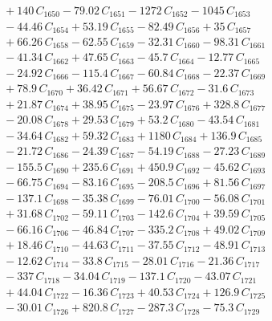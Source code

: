 \documentclass[a4paper,11pt]{article}
\begin{document}
\begin{align}
&\quad + 140\,C_{1650} - 79.02\,C_{1651} - 1272\,C_{1652} - 1045\,C_{1653} \nonumber\\
&\quad - 44.46\,C_{1654} + 53.19\,C_{1655} - 82.49\,C_{1656} + 35\,C_{1657} \nonumber\\
&\quad + 66.26\,C_{1658} - 62.55\,C_{1659} - 32.31\,C_{1660} - 98.31\,C_{1661} \nonumber\\
&\quad - 41.34\,C_{1662} + 47.65\,C_{1663} - 45.7\,C_{1664} - 12.77\,C_{1665} \nonumber\\
&\quad - 24.92\,C_{1666} - 115.4\,C_{1667} - 60.84\,C_{1668} - 22.37\,C_{1669} \nonumber\\
&\quad + 78.9\,C_{1670} + 36.42\,C_{1671} + 56.67\,C_{1672} - 31.6\,C_{1673} \nonumber\\
&\quad + 21.87\,C_{1674} + 38.95\,C_{1675} - 23.97\,C_{1676} + 328.8\,C_{1677} \nonumber\\
&\quad - 20.08\,C_{1678} + 29.53\,C_{1679} + 53.2\,C_{1680} - 43.54\,C_{1681} \nonumber\\
&\quad - 34.64\,C_{1682} + 59.32\,C_{1683} + 1180\,C_{1684} + 136.9\,C_{1685} \nonumber\\
&\quad - 21.72\,C_{1686} - 24.39\,C_{1687} - 54.19\,C_{1688} - 27.23\,C_{1689} \nonumber\\
&\quad - 155.5\,C_{1690} + 235.6\,C_{1691} + 450.9\,C_{1692} - 45.62\,C_{1693} \nonumber\\
&\quad - 66.75\,C_{1694} - 83.16\,C_{1695} - 208.5\,C_{1696} + 81.56\,C_{1697} \nonumber\\
&\quad - 137.1\,C_{1698} - 35.38\,C_{1699} - 76.01\,C_{1700} - 56.08\,C_{1701} \nonumber\\
&\quad + 31.68\,C_{1702} - 59.11\,C_{1703} - 142.6\,C_{1704} + 39.59\,C_{1705} \nonumber\\
&\quad - 66.16\,C_{1706} - 46.84\,C_{1707} - 335.2\,C_{1708} + 49.02\,C_{1709} \nonumber\\
&\quad + 18.46\,C_{1710} - 44.63\,C_{1711} - 37.55\,C_{1712} - 48.91\,C_{1713} \nonumber\\
&\quad - 12.62\,C_{1714} - 33.8\,C_{1715} - 28.01\,C_{1716} - 21.36\,C_{1717} \nonumber\\
&\quad - 337\,C_{1718} - 34.04\,C_{1719} - 137.1\,C_{1720} - 43.07\,C_{1721} \nonumber\\
&\quad + 44.04\,C_{1722} - 16.36\,C_{1723} + 40.53\,C_{1724} + 126.9\,C_{1725} \nonumber\\
&\quad - 30.01\,C_{1726} + 820.8\,C_{1727} - 287.3\,C_{1728} - 75.3\,C_{1729} \nonumber\\

\end{align}
\end{document}
